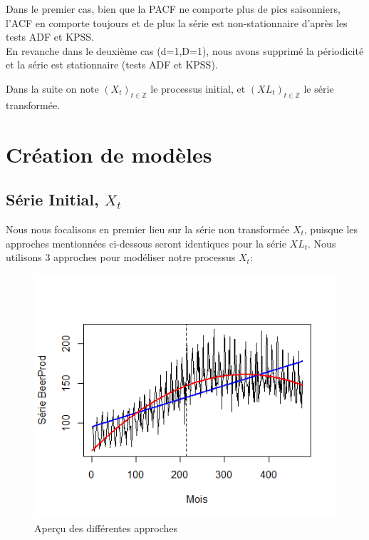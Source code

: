 \documentclass[12pt,a4paper]{book}
\newcommand{\1}{\mathds{1}}
\begin{document}
\vspace{80 mm}
\noindent
Dans le premier cas, bien que la PACF ne comporte plus de pics saisonniers, l'ACF en comporte toujours et de plus la série est non-stationnaire d'après les tests ADF et KPSS.\\ 
En revanche dans le deuxième cas (d=1,D=1), nous avons supprimé la périodicité et la série est stationnaire (tests ADF et KPSS). 


\noindent 
Dans la suite on note $(X_t)_{t\in \mathbb{Z}}$ le processus initial, et $(XL_t)_{t\in \mathbb{Z}}$  le série transformée.


\vspace{5 mm}
\section{Création de modèles}

\subsection{Série Initial, $X_t$}

Nous nous focalisons en premier lieu sur la série non transformée $X_t$, puisque les approches mentionnées ci-dessous seront identiques pour la série $XL_t$.
\noindent
Nous utilisons 3 approches pour modéliser notre processus $X_t$:

\begin{figure}[h]
\centering
    \includegraphics[scale = 0.9]{serie_tendances}  
\caption{Aperçu des différentes approches}
\end{figure}
\end{document}

